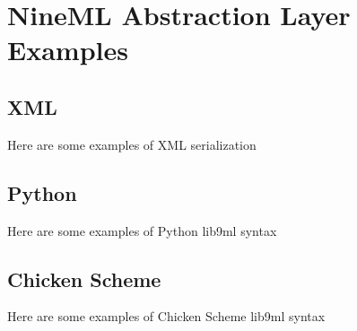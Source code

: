 \documentclass[a4paper]{article}
\begin{document}
\section{\label{ap_examples}NineML Abstraction Layer Examples}

\subsection{XML}

Here are some examples of XML serialization


\subsection{Python}

Here are some examples of Python lib9ml syntax


\subsection{Chicken Scheme}

Here are some examples of Chicken Scheme lib9ml syntax


%
\end{document}
